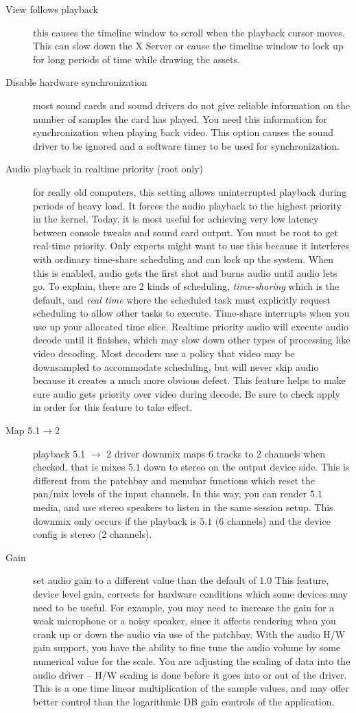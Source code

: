 \begin{description}
    \item[View follows playback] this causes the timeline window to scroll when the playback cursor moves. This can slow down the X Server or cause the timeline window to lock up for long periods of time while drawing the assets.
    \item[Disable hardware synchronization] most sound cards and sound drivers do not give reliable information on the number of samples the card has played. You need this information for synchronization when playing back video. This option causes the sound driver to be ignored and a software timer to be used for synchronization.
    \item[Audio playback in realtime priority (root only)] for really old computers, this setting allows uninterrupted playback during periods of heavy load. It forces the audio playback to the highest priority in the kernel. Today, it is most useful for achieving very low latency between console tweaks and sound card output. You must be root to get real-time priority. Only experts might want to use this because it interferes with ordinary time-share scheduling and can lock up the system.  When this is enabled, audio gets the first shot and burns audio until audio lets go. To explain, there are 2 kinds of scheduling, \textit{time-sharing} which is the default, and \textit{real time} where the scheduled task must explicitly request scheduling to allow other tasks to execute.  Time-share interrupts when you use up your allocated time slice.  Realtime priority audio will execute audio decode until it finishes, which may slow down other types of processing like video decoding.  Most decoders use a policy that video may be downsampled to accommodate scheduling, but will never skip audio because it creates a much more obvious defect.  This feature helps to make sure audio gets priority over video during decode. Be sure to check apply in order for this feature to take effect.
    \item[Map 5.1$\rightarrow$2] playback 5.1 $\rightarrow$ 2 driver downmix maps 6 tracks to 2 channels when checked, that is mixes $5.1$ down to stereo on the output device side.  This is different from the patchbay and menubar functions which reset the pan/mix levels of the input channels.  In this way, you can render $5.1$ media, and use stereo speakers to listen in the same session setup.  This downmix only occurs if the playback is $5.1$ (6 channels) and the device config is stereo (2 channels).
    \item[Gain] set audio gain to a different value than the default of $1.0$ This feature, device level gain, corrects for hardware conditions which some devices may need to be useful.  For example, you may need to increase the gain for a weak microphone or a noisy speaker, since it affects rendering when you crank up or down the audio via use of the patchbay.  With the audio H/W gain support, you have the ability to fine tune the audio volume by some numerical value for the scale.  You are adjusting the scaling of data into the audio driver -- H/W scaling is done before it goes into or out of the driver.  This is a one time linear multiplication of the sample values, and may offer better control than the logarithmic DB gain controls of the application.

\end{description}

